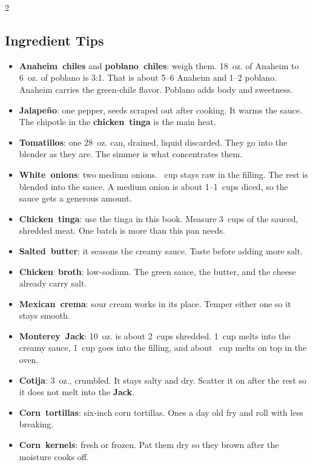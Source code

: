 \documentclass[11pt,letterpaper]{article}
\begin{document}
{\begin{multicols}{2}
\subsection*{Ingredient Tips}
\begin{itemize}
    \item \textbf{Anaheim~chiles} and \textbf{poblano~chiles}: weigh them. 18~oz. of Anaheim to 6~oz. of poblano is 3:1. That is about 5--6 Anaheim and 1--2 poblano. Anaheim carries the green-chile flavor. Poblano adds body and sweetness.
    \item \textbf{Jalapeño}: one pepper, seeds scraped out after cooking. It warms the sauce. The chipotle in the \textbf{chicken~tinga} is the main heat.
    \item \textbf{Tomatillos}: one 28~oz. can, drained, liquid discarded. They go into the blender as they are. The simmer is what concentrates them.
    \item \textbf{White~onions}: two medium onions. ~cup stays raw in the filling. The rest is blended into the sauce. A medium onion is about 1--1~cups diced, so the sauce gets a generous amount.
    \item \textbf{Chicken~tinga}: use the tinga in this book. Measure 3~cups of the sauced, shredded meat. One batch is more than this pan needs.
    \item \textbf{Salted~butter}: it seasons the creamy sauce. Taste before adding more salt.
    \item \textbf{Chicken~broth}: low-sodium. The green sauce, the butter, and the cheese already carry salt.
    \item \textbf{Mexican~crema}: sour cream works in its place. Temper either one so it stays smooth.
    \item \textbf{Monterey~Jack}: 10~oz. is about 2~cups shredded. 1~cup melts into the creamy sauce, 1~cup goes into the filling, and about ~cup melts on top in the oven.
    \item \textbf{Cotija}: 3~oz., crumbled. It stays salty and dry. Scatter it on after the rest so it does not melt into the \textbf{Jack}.
    \item \textbf{Corn~tortillas}: six-inch corn tortillas. Ones a day old fry and roll with less breaking.
    \item \textbf{Corn~kernels}: fresh or frozen. Pat them dry so they brown after the moisture cooks off.
\end{itemize}


\end{multicols}}
\end{document}

